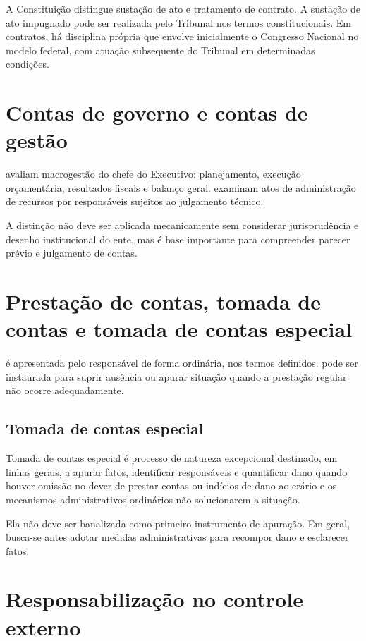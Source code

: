 A Constituição distingue sustação de ato e tratamento de contrato. A sustação de ato impugnado pode ser realizada pelo Tribunal nos termos constitucionais. Em contratos, há disciplina própria que envolve inicialmente o Congresso Nacional no modelo federal, com atuação subsequente do Tribunal em determinadas condições.

\section{Contas de governo e contas de gestão}

 avaliam macrogestão do chefe do Executivo: planejamento, execução orçamentária, resultados fiscais e balanço geral.  examinam atos de administração de recursos por responsáveis sujeitos ao julgamento técnico.

A distinção não deve ser aplicada mecanicamente sem considerar jurisprudência e desenho institucional do ente, mas é base importante para compreender parecer prévio e julgamento de contas.

\section{Prestação de contas, tomada de contas e tomada de contas especial}

 é apresentada pelo responsável de forma ordinária, nos termos definidos.  pode ser instaurada para suprir ausência ou apurar situação quando a prestação regular não ocorre adequadamente.

\subsection{Tomada de contas especial}

Tomada de contas especial é processo de natureza excepcional destinado, em linhas gerais, a apurar fatos, identificar responsáveis e quantificar dano quando houver omissão no dever de prestar contas ou indícios de dano ao erário e os mecanismos administrativos ordinários não solucionarem a situação.

Ela não deve ser banalizada como primeiro instrumento de apuração. Em geral, busca-se antes adotar medidas administrativas para recompor dano e esclarecer fatos.

\section{Responsabilização no controle externo}

